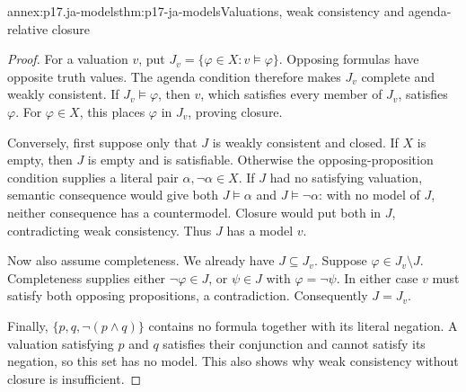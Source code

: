 
\begin{annexitem}{annex:p17.ja-models}{thm:p17-ja-models}{Valuations, weak consistency and agenda-relative closure}
\begin{proof}
For a valuation \(v\), put \(J_v=\{\varphi\in X:v\models\varphi\}\).
Opposing formulas have opposite truth values. The agenda condition therefore
makes \(J_v\) complete and weakly consistent. If \(J_v\models\varphi\),
then \(v\), which satisfies every member of \(J_v\), satisfies \(\varphi\).
For \(\varphi\in X\), this places \(\varphi\) in \(J_v\), proving closure.

Conversely, first suppose only that \(J\) is weakly consistent and closed.
If \(X\) is empty, then \(J\) is empty and is satisfiable. Otherwise the
opposing-proposition condition supplies a literal pair
\(\alpha,\neg\alpha\in X\). If \(J\) had no satisfying valuation, semantic
consequence would give both \(J\models\alpha\) and \(J\models\neg\alpha\):
with no model of \(J\), neither consequence has a countermodel. Closure would
put both in \(J\), contradicting weak consistency. Thus \(J\) has a model \(v\).

Now also assume completeness. We already have \(J\subseteq J_v\). Suppose
\(\varphi\in J_v\setminus J\). Completeness supplies either
\(\neg\varphi\in J\), or \(\psi\in J\) with \(\varphi=\neg\psi\).
In either case \(v\) must satisfy both opposing propositions, a contradiction.
Consequently \(J=J_v\).

Finally, \(\{p,q,\neg(p\land q)\}\) contains no formula together with its
literal negation. A valuation satisfying \(p\) and \(q\) satisfies their
conjunction and cannot satisfy its negation, so this set has no model. This
also shows why weak consistency without closure is insufficient.
\end{proof}
\end{annexitem}

